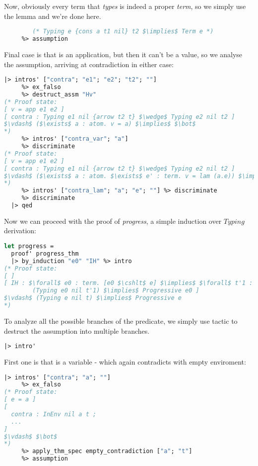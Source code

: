 \documentclass[english, mgr]{iithesis}
\newcommand{\lstt}[1]{{\text{\lstinline[columns=fixed,mathescape]{#1}}}}
\renewcommand{\it}[1]{\textit{#1}}
\begin{document}
Now, obviously every term that \it{types} is indeed a proper \it{term},
so we simply use the \lstt{typing\_terms} lemma and we're done here.
\begin{lstlisting}[mathescape,language=OCaml,escapebegin=\color{codegreen}]
     %> apply_thm_spec typing_terms ["e"; "cons a t1 nil"; "t2"]
        (* Typing e {cons a t1 nil} t2 $\implies$ Term e *)
     %> assumption
\end{lstlisting}
Final case is that \lstt{e} is an application, but then it can't be a value,
so we analyse the \lstt{Hv} assumption, arriving at contradiction in either case:
\begin{lstlisting}[mathescape, language=OCaml]
  |> intros' ["contra"; "e1"; "e2"; "t2"; ""]
     %> ex_falso
     %> destruct_assm "Hv"
(* Proof state:
[ v = app e1 e2 ]
[ contra : Typing e1 nil {arrow t2 t} $\wedge$ Typing e2 nil t2 ]
$\vdash$ ($\exists$ a : atom. v = a) $\implies$ $\bot$
*)
     %> intros' ["contra_var"; "a"]
     %> discriminate
(* Proof state:
[ v = app e1 e2 ]
[ contra : Typing e1 nil {arrow t2 t} $\wedge$ Typing e2 nil t2 ]
$\vdash$ ($\exists$ a : atom. $\exists$ e' : term. v = lam (a.e)) $\implies$ $\bot$
*)
     %> intros' ["contra_lam"; "a"; "e"; ""] %> discriminate
     %> discriminate
  |> qed
\end{lstlisting}
Now we can proceed with the proof of \it{progress}, a simple induction over $Typing$ derivation:
\begin{lstlisting}[mathescape, language=OCaml]
let progress =
  proof' progress_thm
  |> by_induction "e0" "IH" %> intro
(* Proof state:
[ ]
[ IH : $\forall$ e0 : term. [e0 $\cshlt$ e] $\implies$ $\forall$ t'1 : term.
        (Typing e0 nil t'1) $\implies$ Progressive e0 ]
$\vdash$ (Typing e nil t) $\implies$ Progressive e
*)
\end{lstlisting}
To analyze all the possible branches of the \lstt{Typing} predicate,
we simply use \lstt{{intro'}} tactic to destruct the assumption into multiple branches.
\begin{lstlisting}[language=OCaml]
  |> intro'
\end{lstlisting}
First one is that \lstt{e} is a variable - which again contradicts with empty enviroment:
\begin{lstlisting}[language=OCaml, mathescape]
  |> intros' ["contra"; "a"; ""]
     %> ex_falso
(* Proof state:
[ e = a ]
[
  contra : InEnv nil a t ;
  ...
]
$\vdash$ $\bot$
*)
     %> apply_thm_spec empty_contradiction ["a"; "t"]
     %> assumption
\end{lstlisting}
\end{document}
